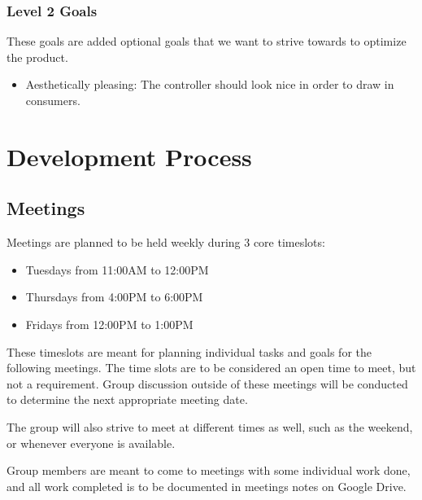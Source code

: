 \documentclass[a4]{article}
\begin{document}
\subsubsection{Level 2 Goals}
These goals are added optional goals that we want to strive towards to optimize the product.
\begin{itemize}
	\item \textcolor{McMasterMaroon}{Aesthetically pleasing}: The controller should look nice in order to draw in consumers.
\end{itemize}
\section{Development Process}
\subsection{Meetings}
Meetings are planned to be held weekly during 3 core timeslots:
\begin{itemize}
	\item Tuesdays from \textcolor{McMasterMaroon}{11:00AM to 12:00PM}
	\item Thursdays from \textcolor{McMasterMaroon}{4:00PM to 6:00PM}
	\item Fridays from \textcolor{McMasterMaroon}{12:00PM to 1:00PM}
\end{itemize}
These timeslots are meant for planning individual tasks and goals for the following meetings. The time slots are to be considered an open time to meet, but not a requirement. Group discussion outside of these meetings will be conducted to determine the next appropriate meeting date.

The group will also strive to meet at different times as well, such as the weekend, or whenever everyone is available.

Group members are meant to come to meetings with some individual work done, and all work completed is to be documented in meetings notes on Google Drive.
\end{document}
